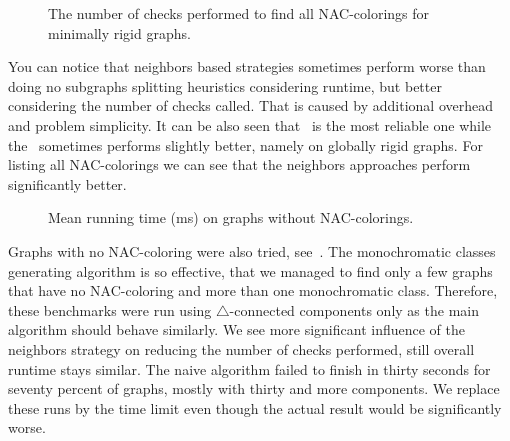 \begin{figure}[t]
	\centering
	\scalebox{0.5}{}
	\caption[Checks performed or minimally rigid graphs.]{
		The number of checks performed to find all NAC-colorings for minimally rigid graphs.}%
	\label{fig:graph_count_minimally_rigid}
\end{figure}

You can notice that neighbors based strategies sometimes perform worse
than doing no subgraphs splitting heuristics considering runtime,
but better considering the number of checks called.
That is caused by additional overhead and problem simplicity.
It can be also seen that \MergeLinear\ is the most reliable one
while the \SharedVertices\ sometimes performs slightly better,
namely on globally rigid graphs.
For listing all NAC-colorings we can see that the neighbors approaches perform
significantly better.

\begin{figure}[h]
	\centering
	\scalebox{0.5}{}
	\caption[Running time on graphs without NAC-colorings.]{
		Mean running time (ms) on graphs without NAC-colorings.}%
	\label{fig:graph_time_no_nac_coloring}
\end{figure}

Graphs with no NAC-coloring were also tried, see~.
The monochromatic classes generating algorithm is so effective,
that we managed to find only a few graphs that have no NAC-coloring
and more than one monochromatic class. Therefore, these benchmarks were run
using $\triangle$-connected components only as the main algorithm should behave similarly.
We see more significant influence of the neighbors strategy
on reducing the number of checks performed,
still overall runtime stays similar.
The naive algorithm failed to finish in thirty seconds
for seventy percent of graphs, mostly with thirty and more components.
We replace these runs by the time limit even though the actual result would
be significantly worse.
